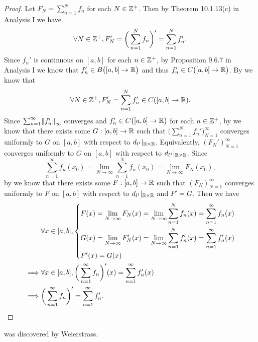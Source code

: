 \begin{proof}
  Let \(F_N = \sum_{n = 1}^N f_n\) for each \(N \in \mathbb{Z}^+\).
  Then by Theorem 10.1.13(c) in Analysis I we have
  \[
    \forall N \in \mathbb{Z}^+, F_N' = \bigg(\sum_{n = 1}^N f_n\bigg)' = \sum_{n = 1}^N f_n'.
  \]
  Since \(f_n'\) is continuous on \([a, b]\) for each \(n \in \mathbb{Z}^+\), by Proposition 9.6.7 in Analysis I we know that \(f_n' \in B\big([a, b] \to \mathbb{R}\big)\) and thus \(f_n' \in C\big([a, b] \to \mathbb{R}\big)\).
  By  we know that
  \[
    \forall N \in \mathbb{Z}^+, F_N' = \sum_{n = 1}^N f_n' \in C([a, b] \to \mathbb{R}).
  \]
  Since \(\sum_{n = 1}^\infty \norm*{f_n'}_\infty\) converges and \(f_n' \in C\big([a, b] \to \mathbb{R}\big)\) for each \(n \in \mathbb{Z}^+\), by  we know that there exists some \(G : [a, b] \to \mathbb{R}\) such that \(\big(\sum_{n = 1}^N f_n'\big)_{N = 1}^\infty\) converges uniformly to \(G\) on \([a, b]\) with respect to \(d_{l^1}|_{\mathbb{R} \times \mathbb{R}}\).
  Equivalently, \((F_N')_{N = 1}^\infty\) converges uniformly to \(G\) on \([a, b]\) with respect to \(d_{l^1}|_{\mathbb{R} \times \mathbb{R}}\).
  Since
  \[
    \sum_{n = 1}^\infty f_n(x_0) = \lim_{N \to \infty} \sum_{n = 1}^N f_n(x_0) = \lim_{N \to \infty} F_N(x_0),
  \]
  by  we know that there exists some \(F : [a, b] \to \mathbb{R}\) such that \((F_N)_{N = 1}^\infty\) converges uniformly to \(F\) on \([a, b]\) with respect to \(d_{l^1}|_{\mathbb{R} \times \mathbb{R}}\) and \(F' = G\).
  Then we have
  \begin{align*}
             & \forall x \in [a, b], \begin{dcases}
                                       F(x) = \lim_{N \to \infty} F_N(x) = \lim_{N \to \infty} \sum_{n = 1}^N f_n(x) = \sum_{n = 1}^\infty f_n(x)    \\
                                       G(x) = \lim_{N \to \infty} F_N'(x) = \lim_{N \to \infty} \sum_{n = 1}^N f_n'(x) = \sum_{n = 1}^\infty f_n'(x) \\
                                       F'(x) = G(x)
                                     \end{dcases} \\
    \implies & \forall x \in [a, b], \bigg(\sum_{n = 1}^\infty f_n\bigg)'(x) = \sum_{n = 1}^\infty f_n'(x)                                         \\
    \implies & \bigg(\sum_{n = 1}^\infty f_n\bigg)' = \sum_{n = 1}^\infty f_n'.
  \end{align*}
\end{proof}

\begin{note}
   was discovered by Weierstrass.
\end{note}

